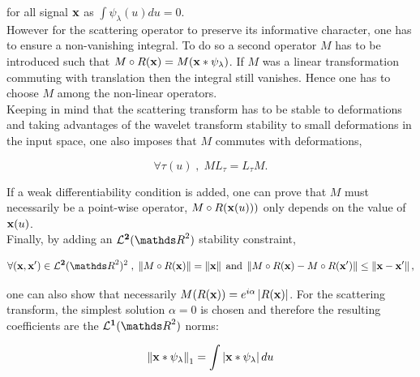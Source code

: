 \documentclass[a4paper,11pt]{report}
\begin{document}
      for all signal ${\bf x}$ as $\int \psi_{\lambda}(u)du = 0$.\\
      
      However for the scattering operator to preserve its informative character, one has to ensure a non-vanishing integral. To do so a second operator $M$ has to be introduced such that $M \circ R({\bf x}) = M({\bf x} \ast \psi_{\lambda})$. If $M$ was a linear  transformation commuting with translation then the integral still vanishes. Hence one has to choose $M$ among the non-linear operators.\\
      
      Keeping in mind that the scattering transform has to be stable to deformations and taking advantages of the wavelet transform stability to small deformations in the input space, one also imposes that $M$ commutes with deformations, 
      
      \begin{equation*}
				\label{eq:Commute with deformations}
				\forall \tau(u) \; , \; M L_{\tau} = L_{\tau} M.
      \end{equation*}
      
      If a weak differentiability condition is added, one can prove \cite{bruna2012commute} that $M$ must necessarily be a point-wise operator, \ie $M \circ R({\bf x}(u)))$ only depends on the value of ${\bf x}(u)$.\\
      
      Finally, by adding an $\mathbf{\mcalL^{2}}(\dsR^{2})$ stability constraint,
      
      \begin{equation*}
				\label{eq:L2 stability}
				\forall (\bfx,\bfx') \in \mathbf{\mcalL^{2}}(\dsR^{2})^{2} \; , \; 
				\norm{M \circ R(\bfx)} = \norm{\bfx} 
				\; \text{and} \;
				\norm{M \circ R(\bfx) - M \circ R(\bfx')} \leq \norm{\bfx-\bfx'},
      \end{equation*}     
      
      one can also show \cite{bruna2012commute} that necessarily $M(R({\bf x}))= e^{i\alpha}\left| R({\bf x}) \right|$. For the scattering transform, the simplest solution $\alpha = 0$ is chosen and therefore the resulting coefficients are the $\mathbf{\mcalL^{1}}(\dsR^{2})$ norms:
       
      \begin{equation*}
				\label{eq:L1 norm}
				\left\lVert {\bf x} \ast \psi_{\lambda} \right\rVert_{1} = \int \left| {\bf x} \ast \psi_{\lambda} \right| du
      \end{equation*}      
      
\end{document}
